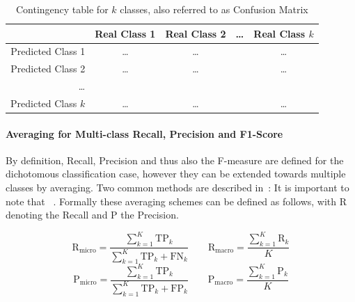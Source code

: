 \begin{center}
  \begin{table}[h]
  \begin{tabular}{r | c c c c }
    & Real Class 1 & Real Class 2 & \ldots & Real Class $k$ \\
    \hline
    Predicted Class 1    & \ldots & \ldots & & \ldots \\
    Predicted Class 2    & \ldots & \ldots & & \ldots \\
    \ldots               & & & & \\
    Predicted Class $k$  & \ldots & \ldots & & \ldots \\
  \end{tabular}
  \caption{Contingency table for $k$ classes, also referred to as Confusion Matrix}
\label{table:contingency-table-k}
\end{table}
\end{center}

\paragraph{Averaging for Multi-class Recall, Precision and F1-Score}
\label{par:Averaging for Multi-class Recall, Precision and F1-Score}

By definition, Recall, Precision and thus also the F-measure are defined for the dichotomous classification case, however they can be extended towards multiple classes by averaging. Two common methods are described in~\cite[Chapter 13.6, p.~280]{Manning:2008aa}: 
It is important to note that ~\cite[Chapter 13.6, p.~280]{Manning:2008aa}. Formally these averaging schemes can be defined as follows, with R denoting the Recall and P the Precision.

\begin{equation}
  \text{R}_{\text{micro}} = \frac{\sum_{k=1}^K \text{TP}_k }{ \sum_{k=1}^K \text{TP}_k + \text{FN}_k } \qquad
  \text{R}_{\text{macro}} = \frac{\sum_{k=1}^K \text{R}_k }{ K }
\end{equation}
\begin{equation}
  \text{P}_{\text{micro}} = \frac{\sum_{k=1}^K \text{TP}_k }{ \sum_{k=1}^K \text{TP}_k + \text{FP}_k } \qquad
  \text{P}_{\text{macro}} = \frac{\sum_{k=1}^K \text{P}_k }{ K }
\end{equation}

